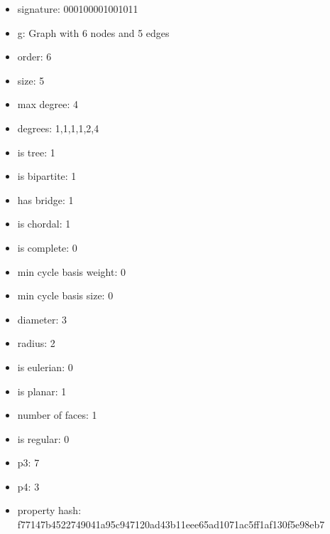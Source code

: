 \begin{itemize}
\item signature: 000100001001011
\item g: Graph with 6 nodes and 5 edges
\item order: 6
\item size: 5
\item max degree: 4
\item degrees: 1,1,1,1,2,4
\item is tree: 1
\item is bipartite: 1
\item has bridge: 1
\item is chordal: 1
\item is complete: 0
\item min cycle basis weight: 0
\item min cycle basis size: 0
\item diameter: 3
\item radius: 2
\item is eulerian: 0
\item is planar: 1
\item number of faces: 1
\item is regular: 0
\item p3: 7
\item p4: 3
\item property hash: f77147b4522749041a95c947120ad43b11eee65ad1071ac5ff1af130f5e98eb7
\end{itemize}
\newpage
\begin{figure}
\end{figure}
